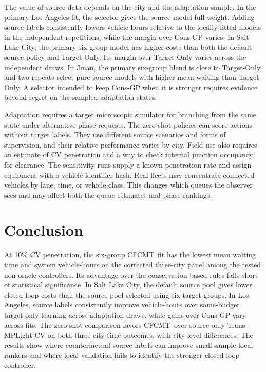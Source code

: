 \documentclass[letterpaper,journal]{IEEEtran}
\newcommand{\method}{CFCMT}
\begin{document}
The value of source data depends on the city and the adaptation sample. In the primary Los Angeles fit, the selector gives the source model full weight. Adding source labels consistently lowers vehicle-hours relative to the locally fitted models in the independent repetitions, while the margin over Cons-GP varies. In Salt Lake City, the primary six-group model has higher costs than both the default source policy and Target-Only. Its margin over Target-Only varies across the independent draws. In Jinan, the primary six-group blend is close to Target-Only, and two repeats select pure source models with higher mean waiting than Target-Only. A selector intended to keep Cons-GP when it is stronger requires evidence beyond regret on the sampled adaptation states.

Adaptation requires a target microscopic simulator for branching from the same state under alternative phase requests. The zero-shot policies can score actions without target labels. They use different source scenarios and forms of supervision, and their relative performance varies by city. Field use also requires an estimate of CV penetration and a way to check internal junction occupancy for clearance. The sensitivity runs supply a known penetration rate and assign equipment with a vehicle-identifier hash. Real fleets may concentrate connected vehicles by lane, time, or vehicle class. This changes which queues the observer sees and may affect both the queue estimates and phase rankings.

\section{Conclusion}
\label{sec:conclusion}

At 10\% CV penetration, the six-group \method\ fit has the lowest mean waiting time and system vehicle-hours on the corrected three-city panel among the tested non-oracle controllers. Its advantage over the conservation-based rules falls short of statistical significance. In Salt Lake City, the default source pool gives lower closed-loop costs than the source pool selected using six target groups. In Los Angeles, source labels consistently improve vehicle-hours over same-budget target-only learning across adaptation draws, while gains over Cons-GP vary across fits. The zero-shot comparison favors \method\ over source-only Trans-MPLight-CV on both three-city time outcomes, with city-level differences. The results show where counterfactual source labels can improve small-sample local rankers and where local validation fails to identify the stronger closed-loop controller.
\end{document}
